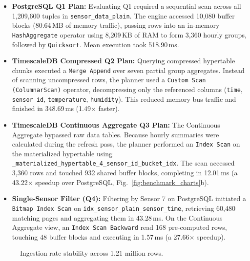 \documentclass[conference,a4paper]{IEEEtran}
\newcommand{\code}[1]{\texttt{\small #1}}
\begin{document}
\begin{itemize}
    \item \textbf{PostgreSQL Q1 Plan:} Evaluating Q1 required a sequential scan across all 1,209,600 tuples in \code{sensor\_data\_plain}. The engine accessed 10,080 buffer blocks (80.64\,MB of memory traffic), passing rows into an in-memory \code{HashAggregate} operator using 8,209\,KB of RAM to form 3,360 hourly groups, followed by \code{Quicksort}. Mean execution took 518.90\,ms.
    \item \textbf{TimescaleDB Compressed Q2 Plan:} Querying compressed hypertable chunks executed a \code{Merge Append} over seven partial group aggregates. Instead of scanning uncompressed rows, the planner used a \code{Custom Scan (ColumnarScan)} operator, decompressing only the referenced columns (\code{time}, \code{sensor\_id}, \code{temperature}, \code{humidity}). This reduced memory bus traffic and finished in 348.69\,ms (1.49$\times$ faster).
    \item \textbf{TimescaleDB Continuous Aggregate Q3 Plan:} The Continuous Aggregate bypassed raw data tables. Because hourly summaries were calculated during the refresh pass, the planner performed an \code{Index Scan} on the materialized hypertable using \code{\_materialized\_hypertable\_4\_sensor\_id\_bucket\_idx}. The scan accessed 3,360 rows and touched 932 shared buffer blocks, completing in 12.01\,ms (a 43.22$\times$ speedup over PostgreSQL, Fig.~\ref{fig:benchmark_charts}b).
    \item \textbf{Single-Sensor Filter (Q4):} Filtering by Sensor 7 on PostgreSQL initiated a \code{Bitmap Index Scan} on \code{idx\_sensor\_plain\_sensor\_time}, retrieving 60,480 matching pages and aggregating them in 43.28\,ms. On the Continuous Aggregate view, an \code{Index Scan Backward} read 168 pre-computed rows, touching 48 buffer blocks and executing in 1.57\,ms (a 27.66$\times$ speedup).
\end{itemize}

\begin{figure}[t]
\centering
{}
\caption{Ingestion rate stability across 1.21 million rows.}
\label{fig:ingestion_scaling}
\end{figure}
\end{document}
